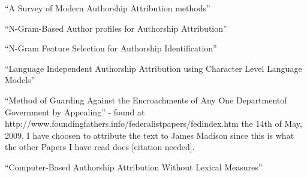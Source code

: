 \begin{thebibliography}{100}

 ``A Survey of Modern Authorship Attribution methods''

 ``N-Gram-Based Author profiles for Authorship Attribution''

 ``N-Gram Feature Selection for Authorship Identification''

 ``Language Independent Authorship Attribution using Character Level Language Models''

 ``Method of Guarding Against the Encroachments of Any One Departmentof Government by Appealing'' - found at http://www.foundingfathers.info/federalistpapers/fedindex.htm the 14th of May, 2009. I have choosen to attribute the text to James Madison since this is what the other Papers I have read does [citation needed].

 ``Computer-Based Authorship Attribution Without Lexical Measures''
\end{thebibliography}
